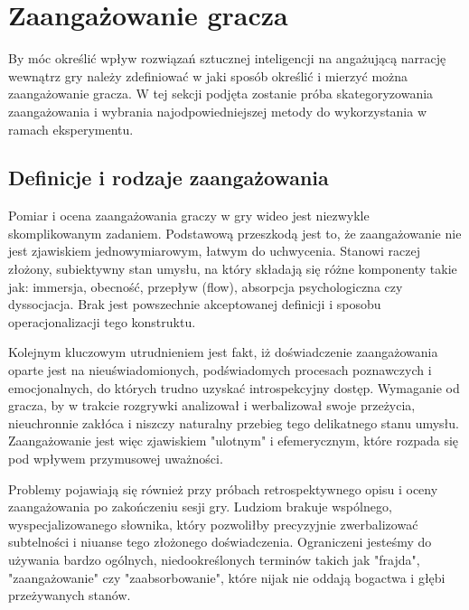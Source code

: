 \graphicspath{{chapters/chapter3/imgs/}}

\chapter{Zaangażowanie gracza}\label{chapter:ch3}

By móc określić wpływ rozwiązań sztucznej inteligencji na angażującą narrację wewnątrz gry należy
zdefiniować w jaki sposób określić i mierzyć można zaangażowanie gracza. W tej sekcji podjęta
zostanie próba skategoryzowania zaangażowania i wybrania najodpowiedniejszej metody do wykorzystania
w ramach eksperymentu.

\section{Definicje i rodzaje zaangażowania}\label{section:ch3_1}

Pomiar i ocena zaangażowania graczy w gry wideo jest niezwykle skomplikowanym zadaniem.
Podstawową przeszkodą jest to, że zaangażowanie nie jest zjawiskiem jednowymiarowym\cite{eng_in_games}, łatwym do
uchwycenia\cite{measuring_user_exp}. Stanowi raczej złożony, subiektywny stan umysłu, na który składają się różne komponenty
takie jak: immersja, obecność, przepływ (flow), absorpcja psychologiczna czy dyssocjacja. Brak jest
powszechnie akceptowanej definicji i sposobu operacjonalizacji tego konstruktu\cite{measuring_user_exp}.

Kolejnym kluczowym utrudnieniem jest fakt, iż doświadczenie zaangażowania oparte jest na
nieuświadomionych, podświadomych procesach poznawczych i emocjonalnych, do których trudno uzyskać
introspekcyjny dostęp\cite{measuring_user_exp}. Wymaganie od gracza, by w trakcie rozgrywki analizował i werbalizował swoje
przeżycia, nieuchronnie zakłóca i niszczy naturalny przebieg tego delikatnego stanu umysłu.
Zaangażowanie jest więc zjawiskiem "ulotnym" i efemerycznym, które rozpada się pod wpływem przymusowej
uważności\cite{measuring_user_exp}.

Problemy pojawiają się również przy próbach retrospektywnego opisu i oceny zaangażowania po zakończeniu
sesji gry. Ludziom brakuje wspólnego, wyspecjalizowanego słownika, który pozwoliłby precyzyjnie
zwerbalizować subtelności i niuanse tego złożonego doświadczenia\cite{measuring_user_exp}.
Ograniczeni jesteśmy do używania bardzo ogólnych, niedookreślonych terminów takich jak "frajda",
"zaangażowanie" czy "zaabsorbowanie", które nijak nie oddają bogactwa i głębi przeżywanych
stanów\cite{measuring_user_exp}.

